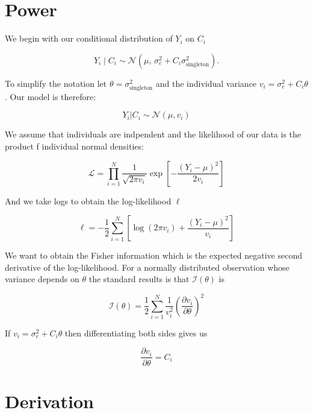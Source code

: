 \documentclass{article}
\begin{document}
\section{Power}

We begin with our conditional distribution of $Y_{i}$ on $C_i$

\begin{equation}
Y_i\mid C_i \sim
\mathcal{N}\left(
\mu,\,
\sigma_e^2+C_i\sigma_{\mathrm{singleton}}^2
\right).
\end{equation}

To simplify the notation let $\theta = \sigma^2_{\text{singleton}}$ and the individual variance $v_i = \sigma^2_e + C_i \theta$. Our model is therefore:

\begin{equation}
    Y_i | C_i \sim \mathcal{N}(\mu, v_i)
\end{equation}

We assume that individuals are indpendent and the likelihood of our data is the product f individual normal densities:

\begin{equation}
    \mathcal{L} = \prod^N_{i=1} \frac{1}{\sqrt{2\pi v_i}} \exp{[-\frac{(Y_i - \mu)^2}{2v_i}]}
\end{equation}

And we take logs to obtain the log-likelihood $\ell$


\begin{equation}
    \ell=
    -\frac12\sum_{i=1}^N
    \left[
    \log(2\pi v_i)+
    \frac{(Y_i-\mu)^2}{v_i}
    \right]
\end{equation}

We want to obtain the Fisher information which is the expected negative second derivative of the log-likelihood. For a normally distributed observation whose variance depends on $\theta$ the standard results is that $\mathcal{I}(\theta)$ is


\[
\mathcal I(\theta)
=
\frac12\sum_{i=1}^N
\frac{1}{v_i^2}
\left(
\frac{\partial v_i}{\partial\theta}
\right)^2
\]

If $v_i = \sigma^2_e + C_i \theta$ then differentiating both sides gives us

\begin{equation}
    \frac{\partial v_i}{\partial \theta} = C_i
\end{equation}



\section{Derivation}
\end{document}
